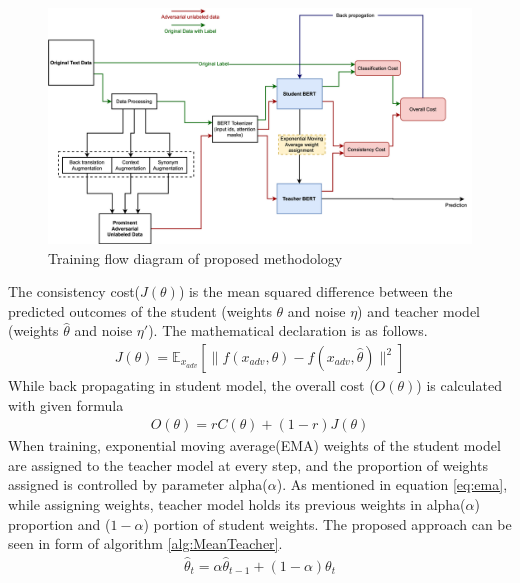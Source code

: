 \documentclass[%
	BCOR=8mm, %
	DIV=12,
	toc=bibliography, %
	toc=listof, %
	oneside, %
	egregdoesnotlikesansseriftitles, %
	]{scrbook}
\begin{document}
 \begin{figure}[h!]
    \centering
    \includegraphics[width=1.1\textwidth]{img/Methodology.png}
    \caption[Training flow diagram of proposed approach]{Training flow diagram of proposed methodology }
    \label{diag:advMTBERT}
\end{figure}
The consistency cost($J(\theta)$)  is the mean squared difference between the predicted outcomes of the student (weights $\theta$ and noise $\eta$) and teacher model (weights $\hat\theta$ and noise $\eta'$).  The mathematical declaration is as follows. 
\begin{equation}
    \begin{aligned}
        J( \theta )=\mathbb{E}_{x_{adv}}[\|f(x_{adv},\theta)-f(x_{adv},\hat\theta)\|^2]
        \label{eq:ADVconsistencycost}
    \end{aligned}
\end{equation}
While back propagating in student model, the overall cost ($\textit{O}(\theta)$) is calculated with given formula 
 \begin{equation}
     \begin{aligned}
         \textit{O}(\theta)= r C(\theta)+(1-r)J(\theta)
         \label{eq:overallcost}
         \end{aligned}
   \end{equation}
   When training, exponential moving average(EMA) weights of the student model are assigned to the teacher model at every step, and the proportion of weights assigned is controlled by parameter alpha($\alpha$). As mentioned in equation \ref{eq:ema}, while assigning weights, teacher model holds its previous weights in alpha($\alpha$) proportion and ($1-\alpha$) portion of student weights. The proposed approach can be seen in form of algorithm \ref{alg:MeanTeacher}.
 \begin{equation}
     \begin{aligned}
         \hat\theta_t= \alpha\hat\theta_{t-1}+(1-\alpha)\theta_t
         \label{eq:ema}
         \end{aligned}
  \end{equation}
\end{document}
